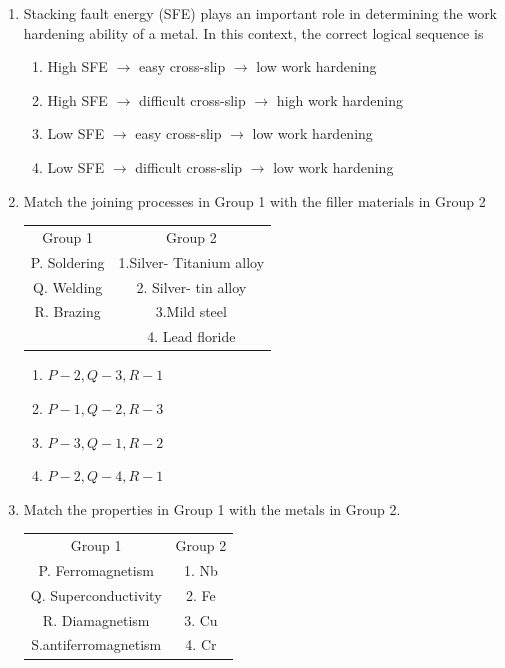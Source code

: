 \documentclass[journal]{IEEEtran}
\theoremstyle{remark}
\begin{document}
\begin{enumerate}
\item  Stacking fault energy (SFE) plays an important role in determining the work hardening ability of a metal. In this context, the correct logical sequence is \hfill{}
\begin{enumerate}
\item  High SFE $\longrightarrow$ easy cross-slip $\longrightarrow$ low work hardening
\item  High SFE $\longrightarrow$ difficult cross-slip $\longrightarrow$  high work hardening
\item  Low SFE $\longrightarrow$ easy cross-slip $\longrightarrow$  low work hardening
\item  Low SFE $\longrightarrow$ difficult cross-slip $\longrightarrow$  low work hardening   
\end{enumerate}
\item Match the joining processes in Group 1 with the filler materials in Group 2\hfill{}
\begin{center}
\begin{tabular}{c c}
Group 1&Group 2\\
P. Soldering&1.Silver- Titanium alloy  \\
Q. Welding     & 2. Silver- tin alloy\\
R. Brazing&3.Mild steel\\
    & 4. Lead floride
\end{tabular}
\end{center}
\begin{multicols}{2}
\begin{enumerate}
        \item $P-2, Q-3, R-1$
        \item $P-1, Q-2, R-3$
        \item  $P-3, Q-1, R-2$
        \item $P-2, Q-4, R-1$
\end{enumerate}
\end{multicols}
\item  Match the properties in Group 1 with the metals in Group 2.\hfill{}
\begin{center}
\begin{tabular}{c c}
Group 1 &Group 2\\
P.  Ferromagnetism&1. Nb \\
Q.  Superconductivity      & 2.  Fe\\
R. Diamagnetism&3. Cu\\
S.antiferromagnetism   & 4.  Cr

\end{tabular}
\end{center}
\end{enumerate}
\end{document}
